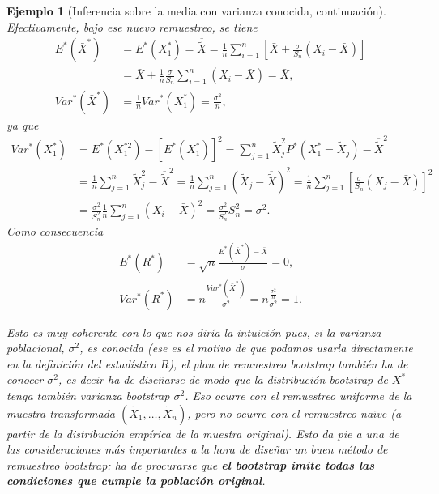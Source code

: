 \documentclass[
]{book}
\theoremstyle{break}
\newtheorem{example}{Ejemplo}[chapter]
\theoremstyle{nonumberplain}
\begin{document}
\begin{example}[Inferencia sobre la media con varianza conocida, continuación]
Efectivamente, bajo ese nuevo remuestreo, se tiene
\[\begin{aligned}
E^{\ast}\left( \bar{X}^{\ast} \right) &= E^{\ast}\left( X_1^{\ast
} \right) =\overline{\tilde{X}}=\frac{1}{n}\sum_{i=1}^{n}\left[ \bar{X}+
\frac{\sigma }{S_n}\left( X_i-\bar{X} \right) \right] \\
&= \bar{X}+\frac{1}{n}\frac{\sigma }{S_n}\sum_{i=1}^{n}\left( X_i-
\bar{X} \right) =\bar{X}, \\
Var^{\ast}\left( \bar{X}^{\ast} \right) &= \frac{1}{n}Var^{\ast
}\left( X_1^{\ast} \right) =\frac{\sigma^2}{n},
\end{aligned}\]
ya que
\[\begin{aligned}
Var^{\ast}\left( X_1^{\ast} \right) &= E^{\ast}\left( X_1^{\ast
2} \right) -\left[ E^{\ast}\left( X_1^{\ast} \right) \right]
^2=\sum_{j=1}^{n}\tilde{X}_j^2P^{\ast}\left( X_1^{\ast}=\tilde{X}
_j \right) -\overline{\tilde{X}}^2 \\
&= \frac{1}{n}\sum_{j=1}^{n}\tilde{X}_j^2-\overline{\tilde{X}}^2=\frac{
1}{n}\sum_{j=1}^{n}\left( \tilde{X}_j-\overline{\tilde{X}} \right)^2=
\frac{1}{n}\sum_{j=1}^{n}\left[ \frac{\sigma }{S_n}\left( X_j-\bar{X} \right) \right]^2 \\
&= \frac{\sigma^2}{S_n^2}\frac{1}{n}\sum_{j=1}^{n}\left( X_i-
\bar{X} \right)^2=\frac{\sigma^2}{S_n^2}S_n^2=\sigma^2.
\end{aligned}\]
Como consecuencia
\[\begin{aligned}
E^{\ast}\left( R^{\ast} \right) &= \sqrt{n}\frac{E^{\ast}\left( 
\bar{X}^{\ast} \right) -\bar{X}}{\sigma }=0, \\
Var^{\ast}\left( R^{\ast} \right) &= n\frac{Var^{\ast}\left( 
\bar{X}^{\ast} \right)}{\sigma^2}=n\frac{\frac{\sigma^2}{n}}{\sigma^2}
=1.
\end{aligned}\]

Esto es muy coherente con lo que nos diría la intuición pues, si la
varianza poblacional, \(\sigma^2\), es conocida (ese es el motivo de
que podamos usarla directamente en la definición del estadístico \(R\)),
el plan de remuestreo bootstrap también ha de conocer \(\sigma^2\), es
decir ha de diseñarse de modo que la distribución bootstrap de
\(X^{\ast}\) tenga también varianza bootstrap \(\sigma^2\). Eso ocurre
con el remuestreo uniforme de la muestra transformada
\(\left( \tilde{X}_1,\ldots ,\tilde{X}_n \right)\), pero no ocurre con
el remuestreo naïve (a partir de la distribución empírica de la muestra
original). Esto da pie a una de las consideraciones más importantes a la
hora de diseñar un buen método de remuestreo bootstrap: ha de procurarse
que \textbf{el bootstrap imite todas las condiciones que cumple la población
original}.


\end{example}
\end{document}
